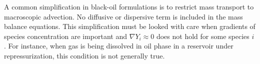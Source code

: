 \documentclass[authoryear,preprint,review,12pt]{elsarticle}
\begin{document}
A common simplification in black-oil formulations is to restrict mass transport to macroscopic advection. No diffusive or dispersive term is included in the mass balance equations. This simplification must be looked with care when gradients of species concentration are important and $\nabla Y_i \approx 0$ does not hold for some species $i$. For instance, when gas is being dissolved in oil phase in a reservoir under repressurization, this condition is not generally true.

%
%
%
\end{document}
